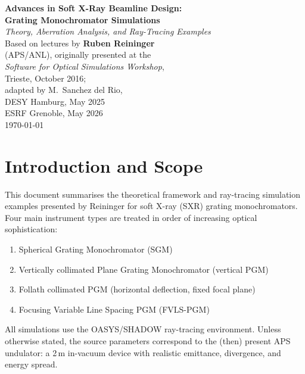 \documentclass[12pt,a4paper]{article}
\begin{document}

\begin{titlepage}
  \centering
  \vspace*{2cm}
  {\huge\bfseries Advances in Soft X-Ray Beamline Design:\\[0.4em]
   Grating Monochromator Simulations}\\[1.5em]
  {\large\itshape Theory, Aberration Analysis, and Ray-Tracing Examples}\\[2em]
  {\normalsize Based on lectures by \textbf{Ruben Reininger}\\
   (APS/ANL), originally presented at the\\
   \textit{Software for Optical Simulations Workshop},\\
   Trieste, October 2016;\\
   adapted by M.\ Sanchez del Rio,\\
   DESY Hamburg, May 2025\\
   ESRF Grenoble, May 2026}\\[4em]
  {\normalsize\today}
  \vfill
\end{titlepage}

\tableofcontents
\newpage

\section{Introduction and Scope}

This document summarises the theoretical framework and ray-tracing simulation examples
presented by Reininger for soft X-ray (SXR) grating monochromators.  Four main instrument
types are treated in order of increasing optical sophistication:

\begin{enumerate}
  \item Spherical Grating Monochromator (SGM)
  \item Vertically collimated Plane Grating Monochromator (vertical PGM)
  \item Follath collimated PGM (horizontal deflection, fixed focal plane)
  \item Focusing Variable Line Spacing PGM (FVLS-PGM)
\end{enumerate}

All simulations use the OASYS/SHADOW ray-tracing environment.  Unless otherwise stated,
the source parameters correspond to the (then) present APS undulator: a 2\,m in-vacuum
device with realistic emittance, divergence, and energy spread.
\end{document}
